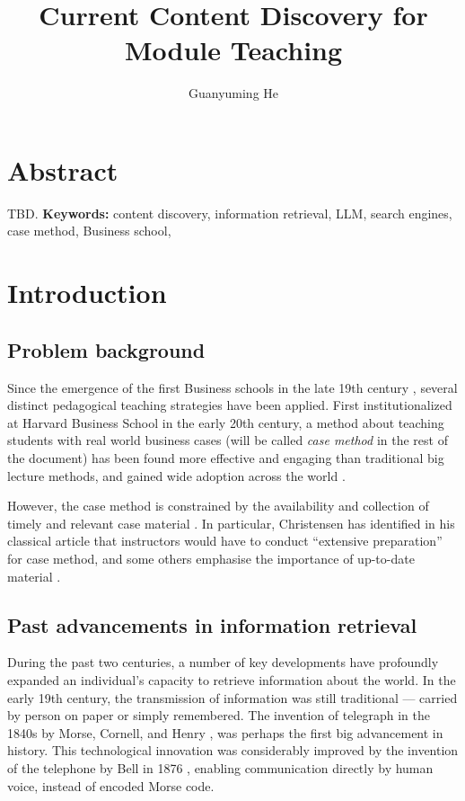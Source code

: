 \documentclass[project-plan]{report-template}
\title{Current Content Discovery for Module Teaching}
\author{Guanyuming He}
\newcommand\casemethod{case method}
\begin{document}
\maketitlepage  

\section*{Abstract}
TBD.
\textbf{Keywords:} content discovery, information retrieval, LLM, search engines, \casemethod, Business school,

\section{Introduction}
\subsection{Problem background}
Since the emergence of the first Business schools in the late 19th century
\cite{first.bis.school.1, first.bis.school.2}, several distinct pedagogical
teaching strategies have been applied.  First institutionalized at Harvard
Business School \cite{case.method.origin.1, case.method.origin.2} in the early
20th century, a method about teaching students with real world business cases
(will be called \emph{\casemethod} in the rest of the document) has been found
more effective and engaging \cite{case.method.support.1, case.method.support.2,
case.method.support.3} than traditional big lecture methods, and gained
wide adoption across the world \cite{case.method.adoption.1,
case.method.adoption.2}.

However, the case method is constrained by the availability and
collection of timely and relevant case material \cite{case.method.limit.1,
case.method.limit.3}. In particular, Christensen has identified in his classical
article that instructors would have to conduct ``extensive preparation''
\cite{case.method.limit.2} for case method, and some others emphasise the
importance of up-to-date material \cite{case.method.limit.4,case.method.limit.5}.

\subsection{Past advancements in information retrieval}
During the past two centuries, a number of key developments have profoundly
expanded an individual's capacity to retrieve information about the world. In
the early 19th century, the transmission of information was still traditional
--- carried by person on paper or simply remembered. The invention of
telegraph in the 1840s by Morse, Cornell, and Henry \cite{history.telegraph.1,
history.telegraph.2}, was perhaps the first big advancement in history. This
technological innovation was considerably improved by the invention of the
telephone by Bell in 1876 \cite{history.telephone.1, history.telephone.2},
enabling communication directly by human voice, instead of encoded Morse code.
\end{document}
